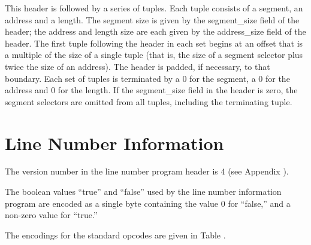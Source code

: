 This header is followed by a series of tuples. Each tuple
consists of a segment, an address and a length. 
The segment
size is given by the segment\_size field of the header; the
address and length size are each given by the address\_size
field of the header. 
The first tuple following the header in
each set begins at an offset that is a multiple of the size
of a single tuple (that is, the size of a segment selector
plus twice the size of an address). 
The header is padded, if
necessary, to that boundary. Each set of tuples is terminated
by a 0 for the segment, a 0 for the address and 0 for the
length. If the segment\_size field in the header is zero,
the segment selectors are omitted from all tuples, including
the terminating tuple.


\section{Line Number Information}
\label{datarep:linenumberinformation}

The version number in the line number program header is 4
(see Appendix ). 

The boolean values ``true'' and ``false'' 
used by the line number information program are encoded
as a single byte containing the value 0 
for ``false,'' and a non-zero value for ``true.''

The encodings for the standard opcodes are given in 
Table .

